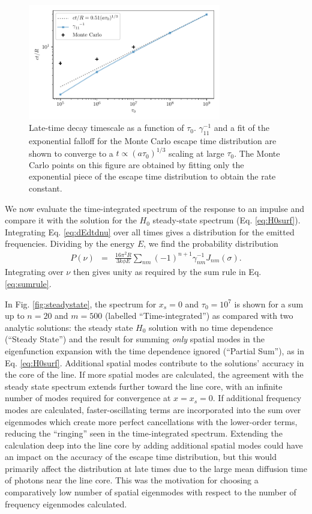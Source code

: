 \documentclass[linenumbers]{aastex63}
\newcommand{\be}{\begin{eqnarray}}
\newcommand{\ee}{\end{eqnarray}}
\begin{document}
\begin{figure}
    \centering
    \includegraphics[width=0.75\textwidth]{tau_scaling.pdf}
    \caption{Late-time decay timescale as a function of $\tau_0$. $\gamma_{11}^{-1}$ and a fit of the exponential falloff for the Monte Carlo escape time distribution are shown to converge to a $t \propto (a\tau_0)^{1/3}$ scaling at large $\tau_0$. The Monte Carlo points on this figure are obtained by fitting only the exponential piece of the escape time distribution to obtain the rate constant.}
    \label{fig:tau_scaling}
\end{figure}

We now evaluate the time-integrated spectrum of the response to an impulse and compare it with the solution for the $H_0$ steady-state spectrum (Eq. \ref{eq:H0surf}). Integrating Eq. \ref{eq:dEdtdnu} over all times gives a distribution for the emitted frequencies. Dividing by the energy $E$, we find the probability distribution
\be \label{eq:spectrum}
P(\nu) & = &  \frac{16\pi^2 R}{3k\phi E}  \sum_{nm} (-1)^{n+1} \gamma_{nm}^{-1} J_{nm}(\sigma).
\ee
Integrating over $\nu$ then gives unity as required by the sum rule in Eq. \ref{eq:sumrule}. 

In Fig. \ref{fig:steadystate}, the spectrum for $x_s=0$ and $\tau_0=10^7$ is shown for a sum up to $n=20$ and $m=500$ (labelled ``Time-integrated'') as compared with two analytic solutions: the steady state $H_0$ solution with no time dependence (``Steady State'') and the result for summing \textit{only} spatial modes in the eigenfunction expansion with the time dependence ignored (``Partial Sum''), as in Eq. \ref{eq:H0surf}. Additional spatial modes contribute to the solutions' accuracy in the core of the line. If more spatial modes are calculated, the agreement with the steady state spectrum extends further toward the line core, with an infinite number of modes required for convergence at $x=x_s=0$. If additional frequency modes are calculated, faster-oscillating terms are incorporated into the sum over eigenmodes which create more perfect cancellations with the lower-order terms, reducing the ``ringing'' seen in the time-integrated spectrum. Extending the calculation deep into the line core by adding additional spatial modes could have an impact on the accuracy of the escape time distribution, but this would primarily affect the distribution at late times due to the large mean diffusion time of photons near the line core. This was the motivation for choosing a comparatively low number of spatial eigenmodes with respect to the number of frequency eigenmodes calculated.
\end{document}
